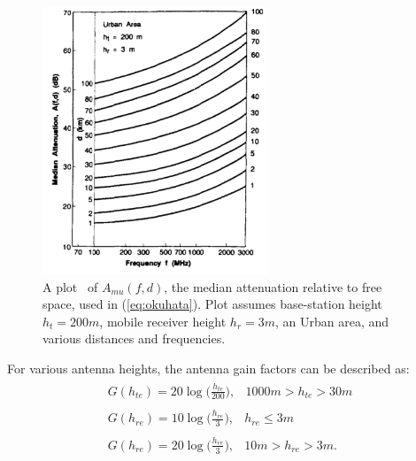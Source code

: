 \begin{figure}[ht!]
	\centering	\includegraphics[width=0.6\textwidth,keepaspectratio]{figs/okumara.png}
    \caption{A plot~\cite{rappaport1996wireless} of $A_{mu}(f,d)$, the median attenuation relative to free space, used in (\ref{eq:okuhata}). Plot assumes base-station height $h_t=200 m$, mobile receiver height $h_r=3 m$, an Urban area, and various distances and frequencies.}
\label{fig:okumara}      
\end{figure}

For various antenna heights, the antenna gain factors can be described as:
\begin{subequations}
\label{eq:antgain}
\begin{align}
\begin{array}{cc}
G(h_{te}) = 20\log \big( \frac{h_{te}}{200} \big), & 1000 m > h_{te} > 30m 
\end{array}
\\
\begin{array}{cc}
G(h_{re}) = 10\log \big( \frac{h_{re}}{3} \big), & h_{re} \leq 3 m
\end{array}
\\
\begin{array}{cc}
G(h_{re}) = 20\log \big( \frac{h_{re}}{3} \big), & 10 m > h_{re} > 3 m.
\end{array}
\end{align}
\end{subequations}


